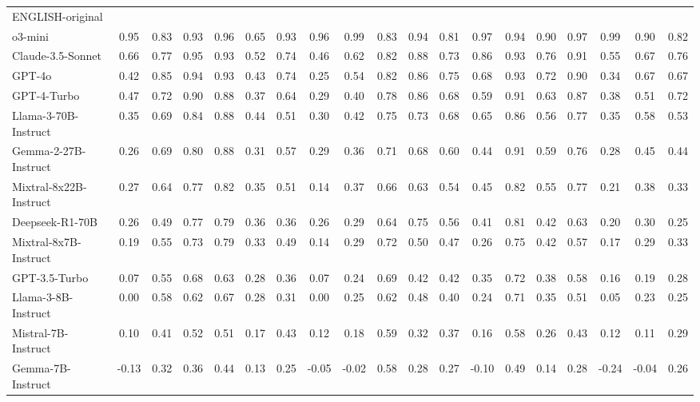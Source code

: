 \begin{table*}[ht]
{\begin{tabular}{lcccccccccccccccccc}
 \textbf{\begin{sideways}machine learning\end{sideways}}\\
\toprule
ENGLISH-original  &&&&&&&&&&&&\\
\midrule
o3-mini & 0.95 & 0.83 & 0.93 & 0.96 & 0.65 & 0.93 & 0.96 & 0.99 & 0.83 & 0.94 & 0.81 & 0.97 & 0.94 & 0.90 & 0.97 & 0.99 & 0.90 & 0.82 \\
Claude-3.5-Sonnet & 0.66 & 0.77 & 0.95 & 0.93 & 0.52 & 0.74 & 0.46 & 0.62 & 0.82 & 0.88 & 0.73 & 0.86 & 0.93 & 0.76 & 0.91 & 0.55 & 0.67 & 0.76 \\
GPT-4o & 0.42 & 0.85 & 0.94 & 0.93 & 0.43 & 0.74 & 0.25 & 0.54 & 0.82 & 0.86 & 0.75 & 0.68 & 0.93 & 0.72 & 0.90 & 0.34 & 0.67 & 0.67 \\
GPT-4-Turbo & 0.47 & 0.72 & 0.90 & 0.88 & 0.37 & 0.64 & 0.29 & 0.40 & 0.78 & 0.86 & 0.68 & 0.59 & 0.91 & 0.63 & 0.87 & 0.38 & 0.51 & 0.72 \\
Llama-3-70B-Instruct & 0.35 & 0.69 & 0.84 & 0.88 & 0.44 & 0.51 & 0.30 & 0.42 & 0.75 & 0.73 & 0.68 & 0.65 & 0.86 & 0.56 & 0.77 & 0.35 & 0.58 & 0.53 \\
Gemma-2-27B-Instruct & 0.26 & 0.69 & 0.80 & 0.88 & 0.31 & 0.57 & 0.29 & 0.36 & 0.71 & 0.68 & 0.60 & 0.44 & 0.91 & 0.59 & 0.76 & 0.28 & 0.45 & 0.44 \\
Mixtral-8x22B-Instruct & 0.27 & 0.64 & 0.77 & 0.82 & 0.35 & 0.51 & 0.14 & 0.37 & 0.66 & 0.63 & 0.54 & 0.45 & 0.82 & 0.55 & 0.77 & 0.21 & 0.38 & 0.33 \\
Deepseek-R1-70B & 0.26 & 0.49 & 0.77 & 0.79 & 0.36 & 0.36 & 0.26 & 0.29 & 0.64 & 0.75 & 0.56 & 0.41 & 0.81 & 0.42 & 0.63 & 0.20 & 0.30 & 0.25 \\
Mixtral-8x7B-Instruct & 0.19 & 0.55 & 0.73 & 0.79 & 0.33 & 0.49 & 0.14 & 0.29 & 0.72 & 0.50 & 0.47 & 0.26 & 0.75 & 0.42 & 0.57 & 0.17 & 0.29 & 0.33 \\
GPT-3.5-Turbo & 0.07 & 0.55 & 0.68 & 0.63 & 0.28 & 0.36 & 0.07 & 0.24 & 0.69 & 0.42 & 0.42 & 0.35 & 0.72 & 0.38 & 0.58 & 0.16 & 0.19 & 0.28 \\
Llama-3-8B-Instruct & 0.00 & 0.58 & 0.62 & 0.67 & 0.28 & 0.31 & 0.00 & 0.25 & 0.62 & 0.48 & 0.40 & 0.24 & 0.71 & 0.35 & 0.51 & 0.05 & 0.23 & 0.25 \\
Mistral-7B-Instruct & 0.10 & 0.41 & 0.52 & 0.51 & 0.17 & 0.43 & 0.12 & 0.18 & 0.59 & 0.32 & 0.37 & 0.16 & 0.58 & 0.26 & 0.43 & 0.12 & 0.11 & 0.29 \\
Gemma-7B-Instruct & -0.13 & 0.32 & 0.36 & 0.44 & 0.13 & 0.25 & -0.05 & -0.02 & 0.58 & 0.28 & 0.27 & -0.10 & 0.49 & 0.14 & 0.28 & -0.24 & -0.04 & 0.26 \\

\end{tabular}}
\end{table*}
